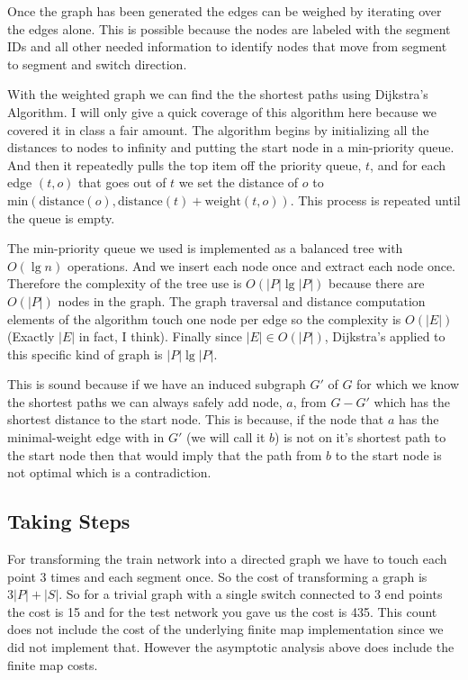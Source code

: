 \documentclass[11pt]{article}
\newcommand{\<}{\langle}
\renewcommand{\>}{\rangle}
\begin{document}
Once the graph has been generated the edges can be weighed by iterating over the edges alone. This is possible because the nodes are labeled with the segment IDs and all other needed information to identify nodes that move from segment to segment and switch direction.

With the weighted graph we can find the the shortest paths using Dijkstra's Algorithm. I will only give a quick coverage of this algorithm here because we covered it in class a fair amount. The algorithm begins by initializing all the distances to nodes to infinity and putting the start node in a min-priority queue. And then it repeatedly pulls the top item off the priority queue, $t$, and for each edge $(t, o)$ that goes out of $t$ we set the distance of $o$ to $\text{min}(\text{distance}(o), \text{distance}(t) + \text{weight}(t,o))$. This process is repeated until the queue is empty.

The min-priority queue we used is implemented as a balanced tree with $O(\lg n)$ operations. And we insert each node once and extract each node once. Therefore the complexity of the tree use is $O(|P|\lg |P|)$ because there are $O(|P|)$ nodes in the graph. The graph traversal and distance computation elements of the algorithm touch one node per edge so the complexity is $O(|E|)$ (Exactly $|E|$ in fact, I think). Finally since $|E| \in O(|P|)$, Dijkstra's applied to this specific kind of graph is $|P|\lg |P|$.

This is sound because if we have an induced subgraph $G'$ of $G$ for which we know the shortest paths we can always safely add node, $a$, from $G - G'$ which has the shortest distance to the start node. This is because, if the node that $a$ has the minimal-weight edge with in $G'$ (we will call it $b$) is not on it's shortest path to the start node then that would imply that the path from $b$ to the start node is not optimal which is a contradiction.

\subsection{Taking Steps}

For transforming the train network into a directed graph we have to touch each point 3 times and each segment once. So the cost of transforming a graph is $3|P| + |S|$. So for a trivial graph with a single switch connected to 3 end points the cost is 15 and for the test network you gave us the cost is 435. This count does not include the cost of the underlying finite map implementation since we did not implement that. However the asymptotic analysis above does include the finite map costs.
\end{document}
